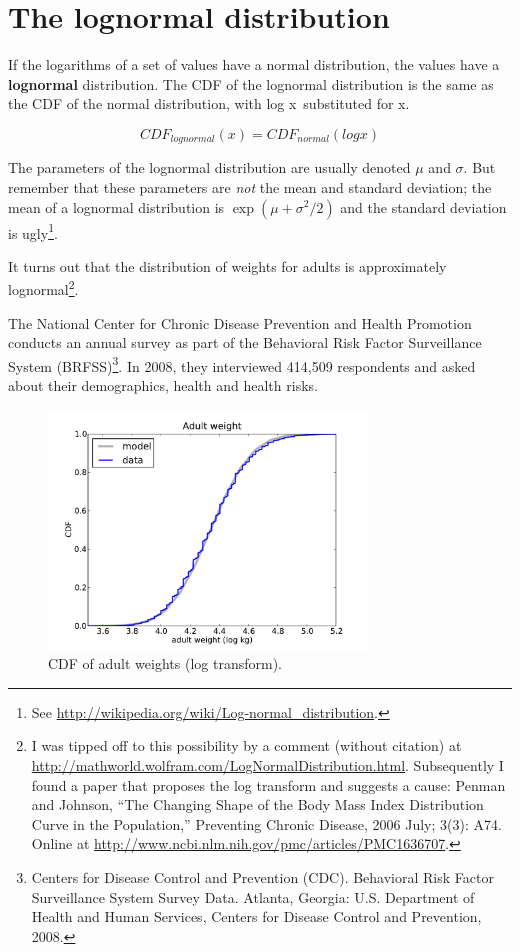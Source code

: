\documentclass[12pt]{book}
\begin{document}
\section{The lognormal distribution}
\label{lognormal}

If the logarithms of a set of values have a normal distribution, the
values have a {\bf lognormal} distribution.  The CDF of the lognormal
distribution is the same as the CDF of the normal distribution,
with log x~substituted for x.

\[ CDF_{lognormal}(x) = CDF_{normal}(log x) \]
 
The parameters of the lognormal distribution are usually denoted
$\mu$ and $\sigma$.  But remember that these parameters are {\em not}
the mean and standard deviation; the mean of a lognormal distribution
is $\exp(\mu + \sigma^2/2)$ and the standard deviation is
ugly\footnote{See \url{http://wikipedia.org/wiki/Log-normal_distribution}.}.
  

It turns out that the distribution of weights for adults is
approximately lognormal\footnote{I was tipped off to this possibility by a
  comment (without citation) at
  \url{http://mathworld.wolfram.com/LogNormalDistribution.html}.
  Subsequently I found a paper that proposes the log transform and
  suggests a cause: Penman and Johnson, ``The Changing Shape of the
  Body Mass Index Distribution Curve in the Population,'' Preventing
  Chronic Disease, 2006 July; 3(3): A74.  Online
  at \url{http://www.ncbi.nlm.nih.gov/pmc/articles/PMC1636707}.}.

The National Center for Chronic Disease
Prevention and Health Promotion conducts an annual survey as part of
the Behavioral Risk Factor Surveillance System
(BRFSS)\footnote{Centers for Disease Control and Prevention
  (CDC). Behavioral Risk Factor Surveillance System Survey
  Data. Atlanta, Georgia: U.S. Department of Health and Human
  Services, Centers for Disease Control and Prevention, 2008.}.  In
2008, they interviewed 414,509 respondents and asked about their
demographics, health and health risks.


\begin{figure}
\centerline{
\includegraphics[height=2.5in]{figs/brfss_weight_log.pdf}
}
\caption{CDF of adult weights (log
  transform).}
\label{brfss_weight_log}
\end{figure}
\end{document}
